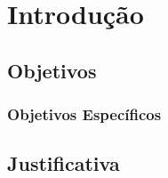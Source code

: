 
\mainmatter
\chapter{Introdução}\label{introducao}
\section{Objetivos}
\subsection{Objetivos Específicos}
\section{Justificativa}